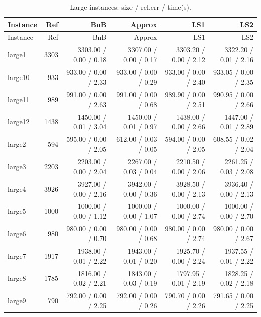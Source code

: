 \begin{longtable}{lrrrrr}
\caption{Large instances: size / rel.err / time(s).\label{tab:large}}\\
\toprule
Instance & Ref & BnB & Approx & LS1 & LS2\\
\midrule
\endfirsthead
\toprule
Instance & Ref & BnB & Approx & LS1 & LS2\\
\midrule
\endhead
large1 & 3303 & 3303.00 / 0.00 / 0.18 & 3307.00 / 0.00 / 0.17 & 3303.20 / 0.00 / 2.12 & 3322.20 / 0.01 / 2.16\\
large10 & 933 & 933.00 / 0.00 / 2.33 & 933.00 / 0.00 / 0.29 & 933.00 / 0.00 / 2.40 & 933.05 / 0.00 / 2.35\\
large11 & 989 & 991.00 / 0.00 / 2.63 & 991.00 / 0.00 / 0.68 & 989.90 / 0.00 / 2.51 & 990.95 / 0.00 / 2.66\\
large12 & 1438 & 1450.00 / 0.01 / 3.04 & 1450.00 / 0.01 / 0.97 & 1438.00 / 0.00 / 2.66 & 1447.00 / 0.01 / 2.89\\
large2 & 594 & 595.00 / 0.00 / 2.05 & 612.00 / 0.03 / 0.05 & 594.00 / 0.00 / 2.05 & 608.55 / 0.02 / 2.04\\
large3 & 2203 & 2203.00 / 0.00 / 2.04 & 2267.00 / 0.03 / 0.04 & 2210.50 / 0.00 / 2.06 & 2261.25 / 0.03 / 2.08\\
large4 & 3926 & 3927.00 / 0.00 / 2.16 & 3942.00 / 0.00 / 0.36 & 3928.50 / 0.00 / 2.13 & 3936.40 / 0.00 / 2.13\\
large5 & 1000 & 1000.00 / 0.00 / 1.12 & 1000.00 / 0.00 / 1.07 & 1000.00 / 0.00 / 2.74 & 1000.00 / 0.00 / 2.70\\
large6 & 980 & 980.00 / 0.00 / 0.70 & 980.00 / 0.00 / 0.68 & 980.00 / 0.00 / 2.74 & 980.00 / 0.00 / 2.67\\
large7 & 1917 & 1938.00 / 0.01 / 2.22 & 1943.00 / 0.01 / 0.20 & 1925.70 / 0.00 / 2.24 & 1937.55 / 0.01 / 2.22\\
large8 & 1785 & 1816.00 / 0.02 / 2.21 & 1843.00 / 0.03 / 0.19 & 1797.95 / 0.01 / 2.19 & 1828.25 / 0.02 / 2.18\\
large9 & 790 & 792.00 / 0.00 / 2.25 & 792.00 / 0.00 / 0.26 & 790.70 / 0.00 / 2.26 & 791.65 / 0.00 / 2.25\\
\bottomrule
\end{longtable}
